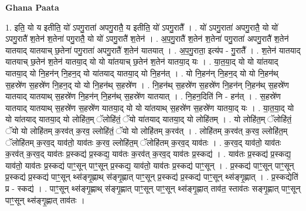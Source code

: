 \documentclass[17pt]{extarticle}
\begin{document}
\textbf{Ghana Paata } \newline

1. इति॒ यो य इतीति॒ यो॑ ऽपगु॒राता॑ अपगु॒रातै॒ य इतीति॒ यो॑ ऽपगु॒रातै᳚ । . यो॑ ऽपगु॒राता॑ अपगु॒रातै॒ यो यो॑ ऽपगु॒रातै॑ श॒तेन॑ श॒तेना॑ पगु॒रातै॒ यो यो॑ ऽपगु॒रातै॑ श॒तेन॑ । . अ॒प॒गु॒रातै॑ श॒तेन॑ श॒तेना॑ पगु॒राता॑ अपगु॒रातै॑ श॒तेन॑ यातयाद् यातयाच् छ॒तेना॑ पगु॒राता॑ अपगु॒रातै॑ श॒तेन॑ यातयात् । . अ॒प॒गु॒राता॒ इत्य॑प - गु॒रातै᳚ । . श॒तेन॑ यातयाद् यातयाच् छ॒तेन॑ श॒तेन॑ यातया॒द् यो यो या॑तयाच् छ॒तेन॑ श॒तेन॑ यातया॒द् यः । . या॒त॒या॒द् यो यो या॑तयाद् यातया॒द् यो नि॒हन॑न् नि॒हन॒द् यो या॑तयाद् यातया॒द् यो नि॒हन॑त् । . यो नि॒हन॑न् नि॒हन॒द् यो यो नि॒हन॑थ् स॒हस्रे॑ण स॒हस्रे॑ण नि॒हन॒द् यो यो नि॒हन॑थ् स॒हस्रे॑ण । . नि॒हन॑थ् स॒हस्रे॑ण स॒हस्रे॑ण नि॒हन॑न् नि॒हन॑थ् स॒हस्रे॑ण यातयाद् यातयाथ् स॒हस्रे॑ण नि॒हन॑न् नि॒हन॑थ् स॒हस्रे॑ण यातयात् । . नि॒हन॒दिति॑ नि - हन॑त् । . स॒हस्रे॑ण यातयाद् यातयाथ् स॒हस्रे॑ण स॒हस्रे॑ण यातया॒द् यो यो या॑तयाथ् स॒हस्रे॑ण स॒हस्रे॑ण यातया॒द् यः । . या॒त॒या॒द् यो यो या॑तयाद् यातया॒द् यो लोहि॑त॒म् ॅलोहि॑तं॒ ॅयो या॑तयाद् यातया॒द् यो लोहि॑तम् । . यो लोहि॑त॒म् ॅलोहि॑तं॒ ॅयो यो लोहि॑तम् क॒रव॑त् क॒रव॒ ल्लोहि॑तं॒ ॅयो यो लोहि॑तम् क॒रव॑त् । . लोहि॑तम् क॒रव॑त् क॒रव॒ ल्लोहि॑त॒म् ॅलोहि॑तम् क॒रव॒द् याव॑तो॒ याव॑तः क॒रव॒ ल्लोहि॑त॒म् ॅलोहि॑तम् क॒रव॒द् याव॑तः । . क॒रव॒द् याव॑तो॒ याव॑तः क॒रव॑त् क॒रव॒द् याव॑तः प्र॒स्कद्य॑ प्र॒स्कद्य॒ याव॑तः क॒रव॑त् क॒रव॒द् याव॑तः प्र॒स्कद्य॑ । . याव॑तः प्र॒स्कद्य॑ प्र॒स्कद्य॒ याव॑तो॒ याव॑तः प्र॒स्कद्य॑ पाꣳ॒॒सून् पाꣳ॒॒सून् प्र॒स्कद्य॒ याव॑तो॒ याव॑तः प्र॒स्कद्य॑ पाꣳ॒॒सून् । . प्र॒स्कद्य॑ पाꣳ॒॒सून् पाꣳ॒॒सून् प्र॒स्कद्य॑ प्र॒स्कद्य॑ पाꣳ॒॒सून् थ्स॑ङ्गृ॒ह्णाथ् स॑ङ्गृ॒ह्णात् पाꣳ॒॒सून् प्र॒स्कद्य॑ प्र॒स्कद्य॑ पाꣳ॒॒सून् थ्स॑ङ्गृ॒ह्णात् । . प्र॒स्कद्येति॑ प्र - स्कद्य॑ । . पाꣳ॒॒सून् थ्स॑ङ्गृ॒ह्णाथ् स॑ङ्गृ॒ह्णात् पाꣳ॒॒सून् पाꣳ॒॒सून् थ्स॑ङ्गृ॒ह्णात् ताव॑त॒ स्ताव॑तः सङ्गृ॒ह्णात् पाꣳ॒॒सून् पाꣳ॒॒सून् थ्स॑ङ्गृ॒ह्णात् ताव॑तः । \newline
\end{document}
